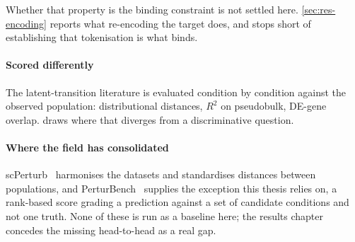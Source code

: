 Whether that property is the binding constraint is not settled here.
\cref{sec:res-encoding} reports what re-encoding the target does, and stops
short of establishing that tokenisation is what binds.

\paragraph{Scored differently} The latent-transition literature is evaluated
condition by condition against the observed population: distributional distances,
$R^2$ on pseudobulk, DE-gene overlap.  draws where that
diverges from a discriminative question.

\begin{figure}[htbp]
\begin{lrbox}{\tvfb}%
%
\end{lrbox}

\end{figure}

\paragraph{Where the field has consolidated}
scPerturb~\cite{scperturb} harmonises the datasets and standardises distances
between populations, and PerturBench~\cite{perturbench} supplies the
exception this thesis relies on, a rank-based score grading a prediction against
a set of candidate conditions and not one truth. None of these is run as a
baseline here; the results chapter concedes the missing head-to-head as a real
gap.


